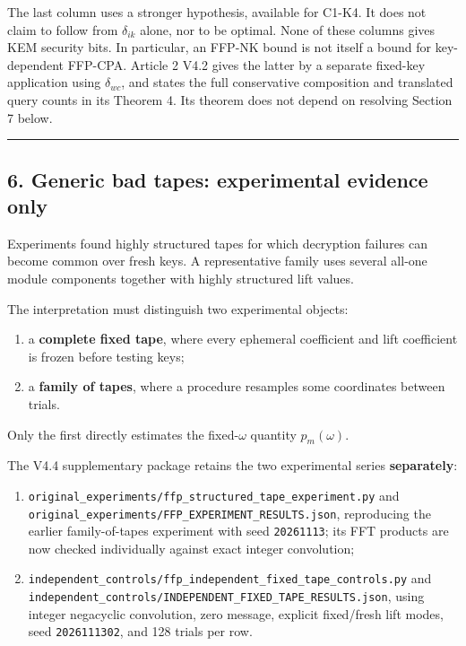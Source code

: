\documentclass[11pt,a4paper]{article}
\providecommand{\tightlist}{\setlength{\itemsep}{0pt}\setlength{\parskip}{0pt}}
\begin{document}
The last column uses a stronger hypothesis, available for C1-K4. It does not claim to follow from \(\delta_{ik}\) alone, nor to be optimal. None of these columns gives KEM security bits. In particular, an FFP-NK bound is not itself a bound for key-dependent FFP-CPA. Article 2 V4.2 gives the latter by a separate fixed-key application using \(\delta_{wc}\), and states the full conservative composition and translated query counts in its Theorem 4. Its theorem does not depend on resolving Section 7 below.

\begin{center}\rule{0.5\linewidth}{0.5pt}\end{center}

\subsection{6. Generic bad tapes: experimental evidence only}\label{generic-bad-tapes-experimental-evidence-only}

Experiments found highly structured tapes for which decryption failures can become common over fresh keys. A representative family uses several all-one module components together with highly structured lift values.

The interpretation must distinguish two experimental objects:

\begin{enumerate}
\def\labelenumi{\arabic{enumi}.}
\tightlist
\item
  a \textbf{complete fixed tape}, where every ephemeral coefficient and lift coefficient is frozen before testing keys;
\item
  a \textbf{family of tapes}, where a procedure resamples some coordinates between trials.
\end{enumerate}

Only the first directly estimates the fixed-\(\omega\) quantity \(p_m(\omega)\).

The V4.4 supplementary package retains the two experimental series \textbf{separately}:

\begin{enumerate}
\def\labelenumi{\arabic{enumi}.}
\tightlist
\item
  \nolinkurl{original_experiments/ffp_structured_tape_experiment.py} and \nolinkurl{original_experiments/FFP_EXPERIMENT_RESULTS.json}, reproducing the earlier family-of-tapes experiment with seed \texttt{20261113}; its FFT products are now checked individually against exact integer convolution;
\item
  \nolinkurl{independent_controls/ffp_independent_fixed_tape_controls.py} and \nolinkurl{independent_controls/INDEPENDENT_FIXED_TAPE_RESULTS.json}, using integer negacyclic convolution, zero message, explicit fixed/fresh lift modes, seed \texttt{2026111302}, and 128 trials per row.
\end{enumerate}
\end{document}
